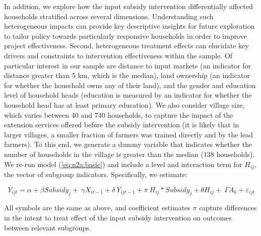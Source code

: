 In addition, we explore how the input subsidy intervention differentially affected households stratified across several dimensions. Understanding such heterogeneous impacts can provide key descriptive insights for future exploration to tailor policy towards particularly responsive households in order to improve project effectiveness. Second, heterogeneous treatment effects can elucidate key drivers and constraints to intervention effectiveness within the sample. Of particular interest in our sample are distance to input markets (an indicator for distance greater than 5 km, which is the median), land ownership (an indicator for whether the household owns any of their land), and the gender and education level of household heads (education is measured by an indicator for whether the household head has at least primary education). We also consider village size, which varies between 40 and 740 households, to capture the impact of the extension services offered before the subsidy intervention (it is likely that in larger villages, a smaller fraction of farmers was trained directly and by the lead farmers). To this end, we generate a dummy variable that indicates whether the number of households in the village is greater than the median (138 households). We re-run model (\ref{eq:n2a:basic}) and include a level and interaction term for $H_{ij}$, the vector of subgroup indicators. Specifically, we estimate:

\begin{equation}
\label{eq:n2a:hte}
Y_{ijt}=\alpha+{\beta Subsidy}_j+\ \gamma X_{it-1}+{\delta\ Y}_{ijt-1}+\pi\ H_{ij}\ast{Subsidy}_j+\theta H_{ij}+\ \Gamma A_k+\varepsilon_{ijt}
\end{equation}

All symbols are the same as above, and coefficient estimates $\pi$ capture differences in the intent to treat effect of the input subsidy intervention on outcomes between relevant subgroups.


